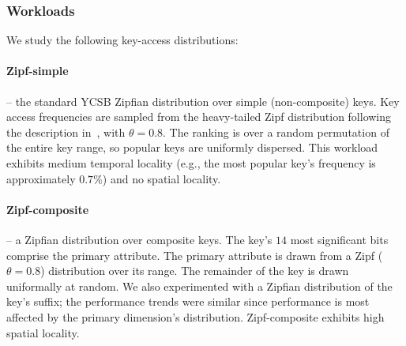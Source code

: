 \subsubsection{Workloads}


We study the following key-access distributions:  

\paragraph{Zipf-simple} -- the standard YCSB Zipfian distribution over simple (non-composite) keys. 
Key access frequencies are sampled from the heavy-tailed Zipf distribution 
following the description in~\cite{Gray:1994:QGB:191839.191886}, with $\theta = 0.8$. 
The ranking is over a random permutation of the entire key range, so popular keys are uniformly dispersed.
This workload exhibits medium temporal locality (e.g., the most popular key's frequency is approximately $0.7\%$)
and no spatial locality. 

\paragraph{Zipf-composite} -- a Zipfian distribution over composite keys. 
The key's $14$ most significant bits comprise the primary attribute. 
The primary attribute is drawn from a Zipf ($\theta=0.8$) distribution over its range. The remainder of the key is drawn uniformally at random.
We also experimented with a Zipfian distribution of the key's suffix; 
the performance trends were similar since performance is most affected by 
 the primary dimension's distribution. Zipf-composite exhibits high spatial locality.%

